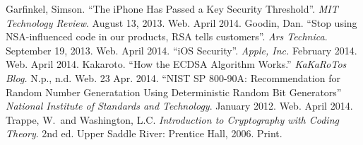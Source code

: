 \begin{thebibliography}{1}
 Garfinkel, Simson. ``The iPhone Has Passed a Key Security Threshold''. \textit{MIT Technology Review}. August 13, 2013. Web. April 2014.
 Goodin, Dan. ``Stop using NSA-influenced code in our products, RSA tells customers''. \textit{Ars Technica}. September 19, 2013. Web. April 2014.
 ``iOS Security''. \textit{Apple, Inc.} February 2014. Web. April 2014.
 Kakaroto. ``How the ECDSA Algorithm Works.'' \textit{KaKaRoTos Blog.} N.p., n.d. Web. 23 Apr. 2014.
 ``NIST SP 800-90A: Recommendation for Random Number Generatation Using Deterministic Random Bit Generators'' \textit{National Institute of Standards and Technology}. January 2012. Web. April 2014.
 Trappe, W.\ and Washington, L.C. \textit{Introduction to Cryptography with Coding Theory}. 2nd ed. Upper Saddle River: Prentice Hall, 2006. Print.
\end{thebibliography}
